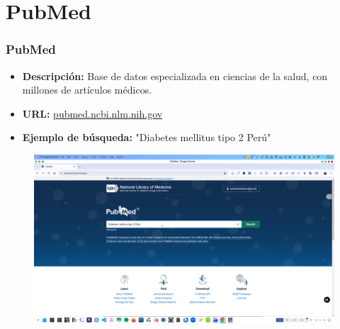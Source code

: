 \documentclass[
11pt, %
]{beamer}
\begin{document}
\section{PubMed}
\begin{frame}
	\frametitle{PubMed}
	\begin{itemize}
		\item \textbf{Descripción:} Base de datos especializada en ciencias de la salud, con millones de artículos médicos.
		\item \textbf{URL:} \href{https://pubmed.ncbi.nlm.nih.gov}{pubmed.ncbi.nlm.nih.gov}
		\item \textbf{Ejemplo de búsqueda:} "Diabetes mellitus tipo 2 Perú"
	\end{itemize}
	\begin{figure}
		\centering
		\includegraphics[width=0.9\linewidth]{images/pubmed.png}
		\label{fig:screenshot010}
	\end{figure}
\end{frame}

\end{document}
